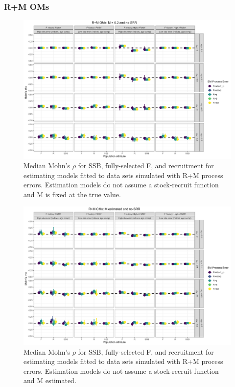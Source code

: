 \documentclass[
  12pt,
]{article}
\begin{document}
\hypertarget{rm-oms-1}{%
\subsubsection*{R+M OMs}\label{rm-oms-1}}

\begin{landscape}
\begin{figure}
\caption{Median Mohn's $\rho$ for SSB, fully-selected F, and recruitment for estimating models fitted to data sets simulated with R+M process errors.  Estimation models do not assume a stock-recruit function and M is fixed at the true value.}\label{M_om_em_R_MF_mohns_rho}
\begin{center}
\includegraphics[width = \textwidth]{M_om_mohns_rho_R_MF.png}
\end{center}
\end{figure}
\end{landscape}

\begin{landscape}
\begin{figure}
\caption{Median Mohn's $\rho$ for SSB, fully-selected F, and recruitment for estimating models fitted to data sets simulated with R+M process errors.  Estimation models do not assume a stock-recruit function and M estimated.}\label{M_om_em_R_ME_mohns_rho}
\begin{center}
\includegraphics[width = \textwidth]{M_om_mohns_rho_R_ME.png}
\end{center}
\end{figure}
\end{landscape}
\end{document}
